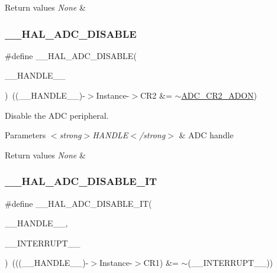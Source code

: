 \begin{DoxyRetVals}{Return values}
{\em None} & \\
\hline
\end{DoxyRetVals}
\mbox{\label{group___a_d_c___exported___macros_ga8afd5963c41c0a30c5cf1fec5c5710b3}} 
\subsubsection{\texorpdfstring{\_\_HAL\_ADC\_DISABLE}{\_\_HAL\_ADC\_DISABLE}}
{\footnotesize\ttfamily \#define \+\_\+\+\_\+\+H\+A\+L\+\_\+\+A\+D\+C\+\_\+\+D\+I\+S\+A\+B\+LE(\begin{DoxyParamCaption}\item[{}]{\+\_\+\+\_\+\+H\+A\+N\+D\+L\+E\+\_\+\+\_\+ }\end{DoxyParamCaption})~((\+\_\+\+\_\+\+H\+A\+N\+D\+L\+E\+\_\+\+\_\+)-\/$>$Instance-\/$>$C\+R2 \&=  $\sim$\mbox{\hyperlink{group___peripheral___registers___bits___definition_ga89b646f092b052d8488d2016f6290f0e}{A\+D\+C\+\_\+\+C\+R2\+\_\+\+A\+D\+ON}})}



Disable the A\+DC peripheral. 


\begin{DoxyParams}{Parameters}
{\em $<$strong$>$\+H\+A\+N\+D\+L\+E$<$/strong$>$} & A\+DC handle \\
\hline
\end{DoxyParams}

\begin{DoxyRetVals}{Return values}
{\em None} & \\
\hline
\end{DoxyRetVals}
\mbox{\label{group___a_d_c___exported___macros_gadcec48b44a2133effd20f41ab227edb9}} 
\subsubsection{\texorpdfstring{\_\_HAL\_ADC\_DISABLE\_IT}{\_\_HAL\_ADC\_DISABLE\_IT}}
{\footnotesize\ttfamily \#define \+\_\+\+\_\+\+H\+A\+L\+\_\+\+A\+D\+C\+\_\+\+D\+I\+S\+A\+B\+L\+E\+\_\+\+IT(\begin{DoxyParamCaption}\item[{}]{\+\_\+\+\_\+\+H\+A\+N\+D\+L\+E\+\_\+\+\_\+,  }\item[{}]{\+\_\+\+\_\+\+I\+N\+T\+E\+R\+R\+U\+P\+T\+\_\+\+\_\+ }\end{DoxyParamCaption})~(((\+\_\+\+\_\+\+H\+A\+N\+D\+L\+E\+\_\+\+\_\+)-\/$>$Instance-\/$>$C\+R1) \&= $\sim$(\+\_\+\+\_\+\+I\+N\+T\+E\+R\+R\+U\+P\+T\+\_\+\+\_\+))}



